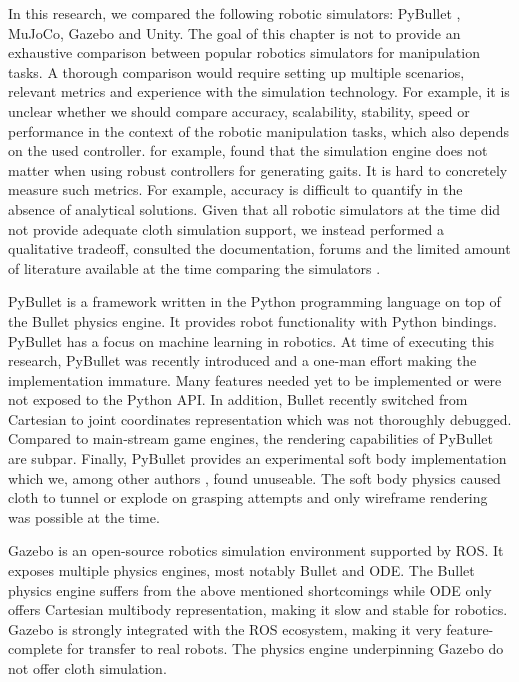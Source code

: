 \documentclass[\home/main.tex]{subfiles}
\begin{document}
In this research, we compared the following robotic simulators: PyBullet \autocite{pybullet}, MuJoCo\texttrademark, Gazebo and Unity\texttrademark \autocite{Unity}. The goal of this chapter is not to provide an exhaustive comparison between popular robotics simulators for manipulation tasks. A thorough comparison would require setting up multiple scenarios, relevant metrics and experience with the simulation technology. For example, it is unclear whether we should compare accuracy, scalability, stability, speed or performance in the context of the robotic manipulation tasks, which also depends on the used controller. \textcite{Giovanni2011} for example, found that the simulation engine does not matter when using robust controllers for generating gaits. It is hard to concretely measure such metrics. For example, accuracy is difficult to quantify in the absence of analytical solutions.
Given that all robotic simulators at the time did not provide adequate cloth simulation support, we instead performed a qualitative tradeoff, consulted the documentation, forums and the limited amount of literature available at the time comparing the simulators \autocite{staranowicz2011survey,Erez2015}.

PyBullet is a framework written in the Python programming language on top of the Bullet physics engine. It provides robot functionality with Python bindings. PyBullet has a focus on machine learning in robotics. At time of executing this research, PyBullet was recently introduced and a one-man effort making the implementation immature. Many features needed yet to be implemented or were not exposed to the Python API. In addition, Bullet recently switched from Cartesian to joint coordinates representation which was not thoroughly debugged. Compared to main-stream game engines, the rendering capabilities of PyBullet are subpar. Finally, PyBullet provides an experimental soft body implementation which we, among other authors \autocite{Matas2018, seita2021learning}, found unuseable. The soft body physics caused cloth to tunnel or explode on grasping attempts and only wireframe rendering was possible at the time. 

Gazebo is an open-source robotics simulation environment supported by ROS. It exposes multiple physics engines, most notably Bullet and ODE. The Bullet physics engine suffers from the above mentioned shortcomings while ODE only offers Cartesian multibody representation, making it slow and stable for robotics. Gazebo is strongly integrated with the ROS ecosystem, making it very feature-complete for transfer to real robots. The physics engine underpinning Gazebo do not offer cloth simulation.
\end{document}
